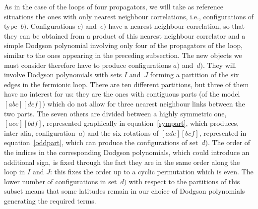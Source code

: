 \documentclass[pdftex]{sigma}
\numberwithin{equation}{section}
\begin{document}
As in the case of the loops of four propagators, we will take as reference situations the ones with only nearest
neighbour correlations, i.e., configurations of type~$b)$. Configurations $c)$ and~$e)$ have a nearest neighbour
correlation, so that they can be obtained from a product of this nearest neighbour correlator and a simple Dodgson
polynomial involving only four of the propagators of the loop, similar to the ones appearing in the preceding
subsection. The new objects we must consider therefore have to produce configurations $a)$ and~$d)$. They
will involve Dodgson polynomials with sets $I$ and~$J$ forming a partition of the six edges in the fermionic
loop. There are ten different partitions, but three of them have no interest for us: they are the ones with
contiguous parts (of the model $[abc][def]$) which do not allow for three nearest neighbour links between the two
parts. The seven others are divided between a highly symmetric one, $[ace][bdf]$, represented graphically in
equation~\eqref{sympart}, which produces, inter alia,
configuration~$a)$ and the six rotations of $[ade][bcf]$, represented in equation~\eqref{oddpart},
which can produce the configurations of set~$d)$. The order of the indices in the corresponding Dodgson polynomials, which could
introduce an additional sign, is fixed through the fact they are in the same order along the loop in $I$ and $J$: this fixes the order up to a
cyclic permutation which is even.
The lower number of configurations in set~$d)$ with respect to the partitions of this subset means that some
latitudes remain in our choice of Dodgson polynomials generating the required terms.
\end{document}
